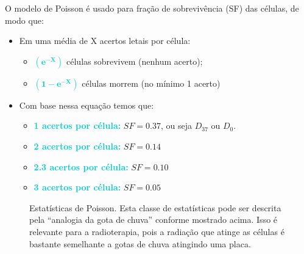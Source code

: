 \documentclass[11pt,a4paper]{article}
\begin{document}
	O modelo de Poisson é usado para fração de sobrevivência (SF) das células, de modo que:

	\begin{itemize}
		\item Em uma média de X acertos letais por célula:
		\begin{itemize}[label=\textcolor{CarnationPink}{$\star$}]
			\item \textcolor{DarkTurquoise}{\textbf{$\mathbf{\left(e^{-X}\right)}$}} células sobrevivem (nenhum acerto);
			\item \textcolor{DarkTurquoise}{\textbf{$\mathbf{\left(1 - e^{-X}\right)}$}} células morrem (no mínimo 1 acerto)
		\end{itemize}

		\item Com base nessa equação temos que:
		\begin{itemize}[label=\textcolor{CarnationPink}{$\star$}]
			\item \textcolor{DarkTurquoise}{\textbf{1 acertos por célula:}} $SF = 0.37$, ou seja $D_{37}$ ou $D_0$.
			\item \textcolor{DarkTurquoise}{\textbf{2 acertos por célula:}} $SF = 0.14$
			\item \textcolor{DarkTurquoise}{\textbf{2.3 acertos por célula:}} $SF = 0.10$
			\item \textcolor{DarkTurquoise}{\textbf{3 acertos por célula:}} $SF = 0.05$
		\end{itemize}
	\end{itemize}

	\begin{figure}[h]
		\centering
		\caption{Estatísticas de Poisson. Esta classe de estatísticas pode ser descrita pela “analogia da gota de chuva” conforme mostrado acima. Isso é relevante para a radioterapia, pois a radiação que atinge as células é bastante semelhante a gotas de chuva atingindo uma placa.}
		\label{fig:estatisticaDePoison}
	\end{figure}
\end{document}
